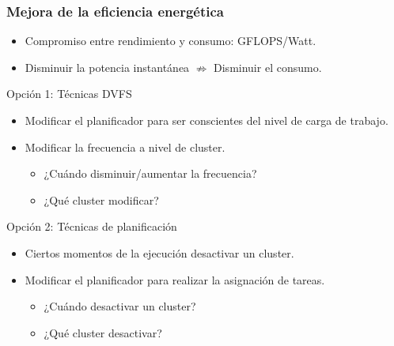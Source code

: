 \documentclass[10pt]{beamer}
\begin{document}
\begin{frame}
  \frametitle{Mejora de la eficiencia energética}
  
  \begin{itemize}
  \item Compromiso entre rendimiento y consumo: GFLOPS/Watt.
  \item Disminuir la potencia instantánea $\nRightarrow$ Disminuir el consumo.
  \end{itemize}

  \vfill

  \begin{block}{Opción 1: Técnicas DVFS}
    \begin{itemize}
    \item Modificar el planificador para ser conscientes del nivel de carga
      de trabajo.
    \item Modificar la frecuencia a nivel de cluster.
      \begin{itemize}
      \item ¿Cuándo disminuir/aumentar la frecuencia?
      \item ¿Qué cluster modificar?
      \end{itemize}
    \end{itemize}
  \end{block}

  \begin{block}{Opción 2: Técnicas de planificación}
    \begin{itemize}
    \item Ciertos momentos de la ejecución desactivar un cluster.
    \item Modificar el planificador para realizar la asignación de tareas.
      
      \begin{itemize}
      \item ¿Cuándo desactivar un cluster?
      \item ¿Qué cluster desactivar?
      \end{itemize}
    \end{itemize}
  \end{block}
\end{frame}
\end{document}

